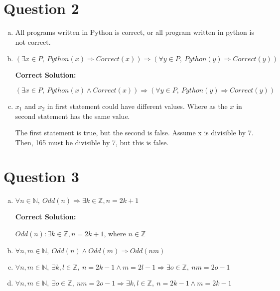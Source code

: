 \documentclass[12pt]{article}
\begin{document}
\section*{Question 2}
\begin{enumerate}[a.]
    \item

    All programs written in Python is correct, or all program written in python
    is not correct.

    \item

    $(\exists x \in P,\:Python(x) \Rightarrow Correct(x)) \Rightarrow (\forall y
    \in P,\:Python(y) \Rightarrow Correct(y))$

    \bigskip

    \textbf{Correct Solution:}

    $(\exists x \in P,\:Python(x) \land Correct(x)) \Rightarrow (\forall y \in P,\:
    Python(y) \Rightarrow Correct(y))$

    \item

    $x_1$ and $x_2$ in first statement could have different values. Where as the $x$ in
    second statement has the same value.

    \bigskip

    The first statement is true, but the second is false. Assume x is divisible by 7.
    Then, 165 must be divisible by 7, but this is false.

\end{enumerate}

\section*{Question 3}
\begin{enumerate}[a.]
    \item

    $\forall n \in \mathbb{N},\:Odd(n) \Rightarrow \exists k \in \mathbb{Z}, n = 2k + 1$

    \bigskip

    \textbf{Correct Solution:}

    $Odd(n): \exists k \in \mathbb{Z}, n = 2k + 1$, where $n \in \mathbb{Z}$

    \item

    $\forall n,m \in \mathbb{N},\:Odd(n) \land Odd(m) \Rightarrow Odd(nm)$

    \item

    $\forall n,m \in \mathbb{N},\: \exists k,l \in \mathbb{Z},\:n = 2k - 1 \land
    m = 2l - 1 \Rightarrow \exists o \in \mathbb{Z},\:nm = 2o - 1$

    \item

    $\forall n,m \in \mathbb{N},\:\exists o \in \mathbb{Z},\:nm = 2o - 1 \Rightarrow
    \exists k,l \in \mathbb{Z},\: n = 2k - 1 \land m = 2k - 1$

\end{enumerate}
\end{document}
